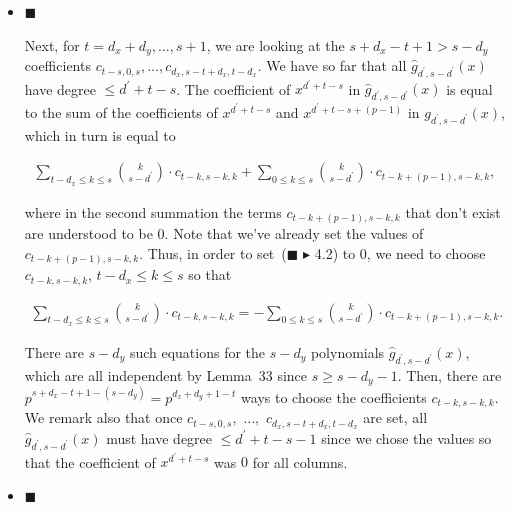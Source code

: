 \documentclass[10pt,a4paper]{article}
\begin{document}
\begin{itemize}
\item[] 
$\blacksquare$ 


Next, for $t=d_{x}+d_{y},\dots,s+1$, we are looking at the $s+d_{x}-t+1>s-d_{y}$ coefficients $c_{t-s,0,s},\dots,c_{d_{x},s-t+d_{x},t-d_{x}}$. We have so far that all $\hat{g}_{d^{\prime},s-d^{\prime}}(x)$ have degree $\leq d^{\prime}+t-s$. The coefficient of $x^{d^{\prime}+t-s}$ in $\hat{g}_{d^{\prime},s-d^{\prime}}(x)$ is equal to the sum of the coefficients of $x^{d^{\prime}+t-s}$ and $x^{d^{\prime}+t-s+(p-1)}$ in $g_{d^{\prime},s-d^{\prime}}(x)$, which in turn is equal to\par


\[\begin{gathered}
\sum_{t-d_{x}\leq k\leq s}\binom{k}{s-d^{\prime}}\cdot c_{t-k,s-k,k}+\sum_{0\leq k\leq s}\binom{k}{s-d^{\prime}}\cdot c_{t-k+(p-1),s-k,k},
\end{gathered}\]


where in the second summation the terms $c_{t-k+(p-1),s-k,k}$ that don’t exist are understood to be $0$. Note that we’ve already set the values of $c_{t-k+(p-1),s-k,k}$. Thus, in order to set ($\blacksquare$ \ensuremath{\blacktriangleright} 4.2) to $0$, we need to choose $c_{t-k,s-k,k}$, $t-d_{x}\leq k\leq s$ so that\par


\[\begin{gathered}
\sum_{t-d_{x}\leq k\leq s}\binom{k}{s-d^{\prime}}\cdot c_{t-k,s-k,k}=-\sum_{0\leq k\leq s}\binom{k}{s-d^{\prime}}\cdot c_{t-k+(p-1),s-k,k}.
\end{gathered}\]


There are $s-d_{y}$ such equations for the $s-d_{y}$ polynomials $\hat{g}_{d^{\prime},s-d^{\prime}}(x)$, which are all independent by Lemma 33 since $s\geq s-d_{y}-1$. Then, there are $p^{s+d_{x}-t+1-(s-d_{y})}=p^{d_{x}+d_{y}+1-t}$ ways to choose the coefficients $c_{t-k,s-k,k}$. We remark also that once $c_{t-s,0,s},$ $\dots,$ $c_{d_{x},s-t+d_{x},t-d_{x}}$ are set, all $\hat{g}_{d^{\prime},s-d^{\prime}}(x)$ must have degree $\leq d^{\prime}+t-s-1$ since we chose the values so that the coefficient of $x^{d^{\prime}+t-s}$ was $0$ for all columns.\par





\item[] 
$\blacksquare$ 



\end{itemize}
\end{document}
